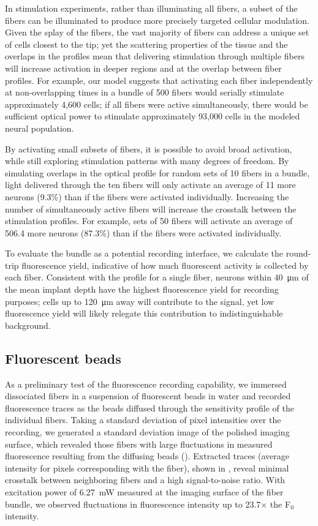 In stimulation experiments, rather than illuminating all fibers, 
a subset of the fibers can be illuminated to produce more 
precisely targeted cellular modulation. 
Given the splay of the fibers, the vast majority of fibers 
can address a unique set of cells closest to the tip; yet 
the scattering properties of the tissue and the overlaps in 
the profiles mean that delivering stimulation through 
multiple fibers will increase activation in deeper regions 
and at the overlap between fiber profiles. For example, 
our model suggests that activating each fiber independently 
at non-overlapping times in a bundle of 500 fibers would 
serially stimulate approximately 4,600 cells; if all fibers were 
active simultaneously, there would be sufficient optical 
power to stimulate approximately 93,000 cells in the modeled 
neural population.

By activating small subsets of fibers, it is possible to avoid 
broad activation, while still exploring stimulation patterns 
with many degrees of freedom. By simulating overlaps in the 
optical profile for random sets of 10 fibers in a bundle, light 
delivered through the ten fibers will only activate an average 
of 11 more neurons (9.3\%) than if the fibers were activated 
individually. Increasing the number of simultaneously active fibers will increase 
the crosstalk between the stimulation profiles. For example, 
sets of 50 fibers will activate an average of 506.4 more 
neurons (87.3\%) than if the fibers were activated individually.

To evaluate the bundle as a potential recording interface, we calculate the 
round-trip fluorescence yield, indicative of how much 
fluorescent activity is collected by each fiber. Consistent with 
the profile for a single fiber, neurons within 40~\si{\micro\meter} of the mean 
implant depth have the highest fluorescence yield for recording 
purposes; cells up to 120~\si{\micro\meter} away will contribute to the signal, yet 
low fluorescence yield will likely relegate this contribution to 
indistinguishable background.

\subsection{Fluorescent beads}

As a preliminary test of the fluorescence recording capability, 
we immersed dissociated fibers in a suspension of fluorescent 
beads in water and recorded fluorescence traces as the beads diffused 
through the sensitivity profile of the individual fibers. Taking a standard deviation 
of pixel intensities over the recording, we generated a standard 
deviation image of the polished imaging surface, which revealed 
those fibers with large fluctuations in measured fluorescence 
resulting from the diffusing beads (). Extracted traces (average 
intensity for pixels corresponding with the fiber), shown 
in , reveal minimal crosstalk between neighboring 
fibers and a high signal-to-noise ratio. With excitation power of 
6.27~mW measured at the imaging surface of the fiber bundle, we 
observed fluctuations in fluorescence intensity up to 
23.7$\times$ the F$_0$ intensity.

